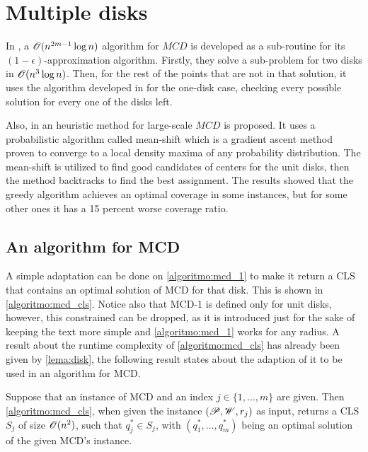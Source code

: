 \section{Multiple disks}


In , a $\mathscr{O}(n^{2m-1}\log{n})$ algorithm for $MCD$ is developed as a sub-routine for its $(1-\epsilon)$-approximation algorithm. Firstly, they solve a sub-problem for two disks in $\mathscr{O}(n^3\log{n})$. Then, for the rest of the points that are not in that solution, it uses the algorithm developed in  for the one-disk case, checking every possible solution for every one of the disks left.

Also, in  an heuristic method for large-scale $MCD$ is proposed. It uses a probabilistic algorithm called mean-shift which is a gradient ascent method proven to converge to a local density maxima of any probability distribution. The mean-shift is utilized to find good candidates of centers for the unit disks, then the method backtracks to find the best assignment. The results showed that the greedy algorithm achieves an optimal coverage in some instances, but for some other ones it has a 15 percent worse coverage ratio.

\subsection{An algorithm for MCD}

A simple adaptation can be done on \autoref{algoritmo:mcd_1} to make it return a CLS that contains an optimal solution of MCD for that disk. This is shown in \autoref{algoritmo:mcd_cls}. 
Notice also that MCD-1 is defined only for unit disks, however, this constrained can be dropped, as it is introduced just for the sake of keeping the text more simple and \autoref{algoritmo:mcd_1} works for any radius. A result about the runtime complexity of \autoref{algoritmo:mcd_cls} has already been given by \autoref{lema:disk}, the following result states about the adaption of it to be used in an algorithm for MCD.

\begin{lema}\label{lema:mcd}
	Suppose that an instance of MCD and an index $j\in\{1, \dots, m\}$ are given.
	Then \autoref{algoritmo:mcd_cls}, when given the instance $(\mathscr{P}, \mathscr{W}, r_j)$ as input, returns a CLS $S_j$ of size $\mathscr{O}(n^2)$, such that $q^*_j\in S_j$, with $(q^*_1, \dots, q^*_m)$ being an optimal solution of the given MCD's instance.
\end{lema}

